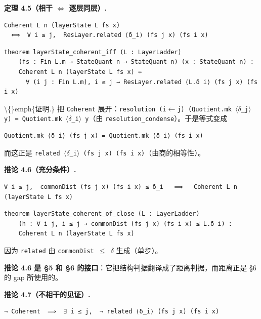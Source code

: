 \documentclass[11pt,a4paper]{ctexart}
\begin{document}
\textbf{定理 4.5（相干 \ensuremath{\Longleftrightarrow} 逐层同层）.}

\begin{lstlisting}
Coherent L n (layerState L fs x)
  ⟺  ∀ i ≤ j,  ResLayer.related ⟨δ_i⟩ (fs j x) (fs i x)
\end{lstlisting}

\begin{lstlisting}
theorem layerState_coherent_iff (L : LayerLadder)
    (fs : Fin L.m → StateQuant n → StateQuant n) (x : StateQuant n) :
    Coherent L n (layerState L fs x) ↔
      ∀ (i j : Fin L.m), i ≤ j → ResLayer.related ⟨L.δ i⟩ (fs j x) (fs i x)
\end{lstlisting}

\textbackslash\{\}emph\{证明.\} 把 \texttt{Coherent} 展开：\texttt{resolution (i\ensuremath{\leftarrow}j) (Quotient.mk \ensuremath{\langle}\ensuremath{\delta}\_j\ensuremath{\rangle} y) = Quotient.mk \ensuremath{\langle}\ensuremath{\delta}\_i\ensuremath{\rangle} y}（由 \texttt{resolution\_condense}）。于是等式变成

\begin{lstlisting}
Quotient.mk ⟨δ_i⟩ (fs j x) = Quotient.mk ⟨δ_i⟩ (fs i x)
\end{lstlisting}

而这正是 \texttt{related \ensuremath{\langle}\ensuremath{\delta}\_i\ensuremath{\rangle} (fs j x) (fs i x)}（由商的相等性）。

\textbf{推论 4.6（充分条件）.}

\begin{lstlisting}
∀ i ≤ j,  commonDist (fs j x) (fs i x) ≤ δ_i   ⟹   Coherent L n (layerState L fs x)
\end{lstlisting}

\begin{lstlisting}
theorem layerState_coherent_of_close (L : LayerLadder)
    (h : ∀ i j, i ≤ j → commonDist (fs j x) (fs i x) ≤ L.δ i) :
    Coherent L n (layerState L fs x)
\end{lstlisting}

因为 \texttt{related} 由 \texttt{commonDist \ensuremath{\le} \ensuremath{\delta}} 生成（单步）。

\textbf{推论 4.6 是 §5 和 §6 的接口}：它把结构判据翻译成了距离判据，而距离正是 §6 的 gap 所使用的。

\textbf{推论 4.7（不相干的见证）.}

\begin{lstlisting}
¬ Coherent  ⟹  ∃ i ≤ j,  ¬ related ⟨δ_i⟩ (fs j x) (fs i x)
\end{lstlisting}
\end{document}
